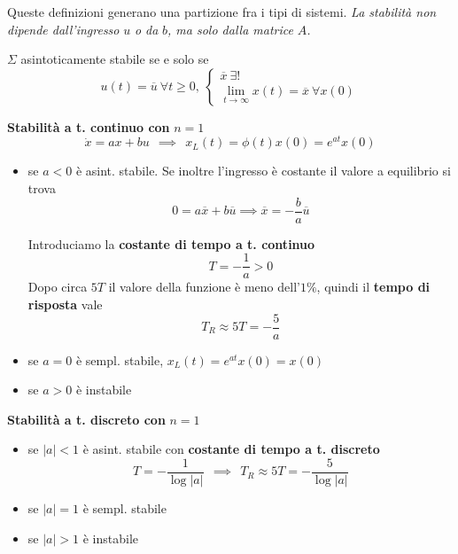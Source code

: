 Queste definizioni generano una partizione fra i tipi di sistemi. \textit{La stabilità non dipende dall'ingresso }$u$\textit{ o da }$b$\textit{, ma solo dalla matrice }$A$\textit{.}
\begin{thm}
	$\Sigma $ asintoticamente stabile se e solo se
	\begin{equation*}
		u\left(t\right) =\overline{u} \ \forall t\geq 0,\ \begin{cases}
		\overline{x} \ \exists !\\
		 \lim\limits _{t\to \infty } x\left(t\right) =\overline{x} \ \forall x\left(0\right)
		\end{cases}
	\end{equation*}
\end{thm}
\textbf{Stabilità a t. continuo con }$n=1$\textbf{ }
\begin{equation*}
	\dot{x} =ax+bu\ \ \implies \ \ x_L\left(t\right) =\phi \left(t\right) x\left(0\right) =e^{at} x\left(0\right)
\end{equation*}
\begin{itemize}
	\item se $a< 0$ è asint. stabile. Se inoltre l'ingresso è costante il valore a equilibrio si trova\begin{equation*}
	      0=a\overline{x} +b\overline{u} \implies \overline{x} =-\frac{b}{a}\overline{u}
	\end{equation*}
	
	Introduciamo la \textbf{costante di tempo a t. continuo}\begin{equation*}
	\boxed{T=-\frac{1}{a}  >0}
	\end{equation*}Dopo circa $5T$ il valore della funzione è meno dell'$1\%$, quindi il \textbf{tempo di risposta} vale\begin{equation*}
	\boxed{T_R \approx 5T=-\frac{5}{a}}
	\end{equation*}
	\item se $a=0$ è sempl. stabile, $x_L\left(t\right) =e^{at} x\left(0\right) =x\left(0\right)$
	\item se $a >0$ è instabile
\end{itemize}

\textbf{Stabilità a t. discreto con} $n=1$
\begin{itemize}
	\item se $\left| a\right| < 1$ è asint. stabile con \textbf{costante di tempo a t. discreto}\begin{equation*}
	      \boxed{T=-\frac{1}{\log\left| a\right| }} \ \ \implies \ \ \boxed{T_R \approx 5T=-\frac{5}{\log\left| a\right| }}
	\end{equation*}
	\item se $\left| a\right| =1$ è sempl. stabile
	\item se $\left| a\right|  >1$ è instabile
\end{itemize}


